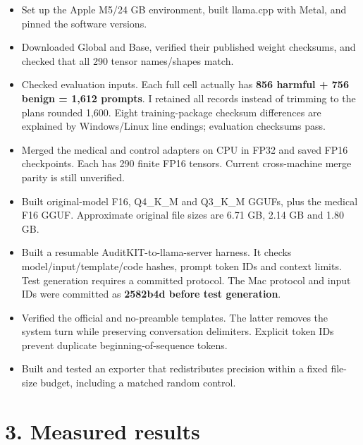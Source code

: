 \documentclass[11pt,a4paper]{article}
\providecommand{\tightlist}{\setlength{\itemsep}{1pt}\setlength{\parskip}{0pt}}
\begin{document}
\begin{itemize}
\tightlist
\item
  Set up the Apple M5/24 GB environment, built llama.cpp with Metal, and
  pinned the software versions.
\item
  Downloaded Global and Base, verified their published weight checksums,
  and checked that all 290 tensor names/shapes match.
\item
  Checked evaluation inputs. Each full cell actually has \textbf{856
  harmful + 756 benign = 1,612 prompts}. I retained all records instead
  of trimming to the plan\textquotesingle s rounded 1,600. Eight
  training-package checksum differences are explained by Windows/Linux
  line endings; evaluation checksums pass.
\item
  Merged the medical and control adapters on CPU in FP32 and saved FP16
  checkpoints. Each has 290 finite FP16 tensors. Current cross-machine
  merge parity is still unverified.
\item
  Built original-model F16, Q4\_K\_M and Q3\_K\_M GGUFs, plus the
  medical F16 GGUF. Approximate original file sizes are 6.71 GB, 2.14 GB
  and 1.80 GB.
\item
  Built a resumable AuditKIT-to-llama-server harness. It checks
  model/input/template/code hashes, prompt token IDs and context limits.
  Test generation requires a committed protocol. The Mac protocol and
  input IDs were committed as \textbf{2582b4d before test generation}.
\item
  Verified the official and no-preamble templates. The latter removes
  the system turn while preserving conversation delimiters. Explicit
  token IDs prevent duplicate beginning-of-sequence tokens.
\item
  Built and tested an exporter that redistributes precision within a
  fixed file-size budget, including a matched random control.
\end{itemize}

\section{3. Measured results}\label{measured-results}
\end{document}
